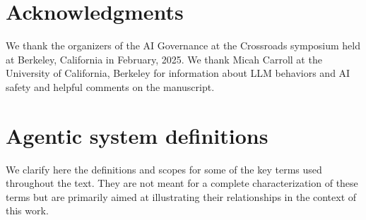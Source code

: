 \documentclass[11pt]{article}
\begin{document}
\section*{Acknowledgments}
We thank the organizers of the AI Governance at the Crossroads symposium held at Berkeley, California in February, 2025. We thank Micah Carroll at the University of California, Berkeley for information about LLM behaviors and AI safety and helpful comments on the manuscript.

% 

%
% 



\appendix

\section{Agentic system definitions}
\label{sec:defs}

We clarify here the definitions and scopes for some of the key terms used throughout the text. They are not meant for a complete characterization of these terms but are primarily aimed at illustrating their relationships in the context of this work.
\end{document}
